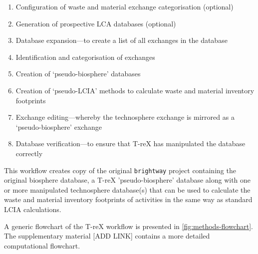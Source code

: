 \begin{enumerate}
    \item Configuration of waste and material exchange categorisation (optional)
    \item Generation of prospective LCA databases (optional)
    \item Database expansion---to create a list of all exchanges in the database
    \item Identification and categorisation of exchanges
    \item Creation of `pseudo-biosphere' databases
    \item Creation of `pseudo-LCIA' methods to calculate waste and material inventory footprints
    \item Exchange editing---whereby the technosphere exchange is mirrored as a `pseudo-biosphere' exchange
    \item Database verification---to ensure that T-reX has manipulated the database correctly
\end{enumerate}

This workflow creates copy of the original \texttt{brightway} project containing the original biosphere database, a T-reX 'pseudo-biosphere' database along with one or more manipulated technosphere database(s) that can be used to calculate the waste and material inventory footprints of activities in the same way as standard LCIA calculations.

A generic flowchart of the T-reX workflow is presented in \autoref{fig:methods-flowchart}. The supplementary material [ADD LINK] contains a more detailed computational flowchart.

